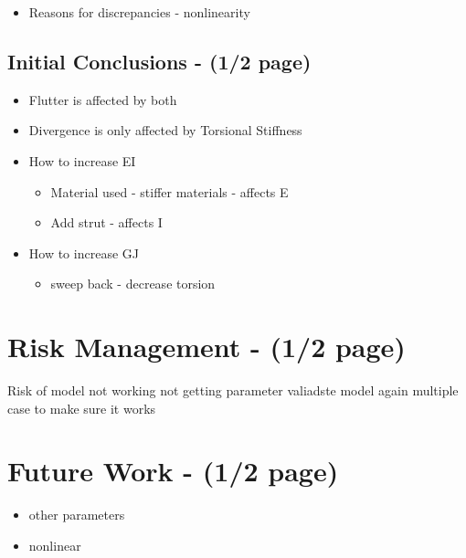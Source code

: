 \documentclass[11pt]{article}
\begin{document}
\begin{itemize}
    \item Reasons for discrepancies - nonlinearity
\end{itemize}

\subsection{Initial Conclusions - (1/2 page)}
\begin{itemize}
    \item Flutter is affected by both
    \item Divergence is only affected by Torsional Stiffness
    \item How to increase EI
    \begin{itemize}
        \item Material used - stiffer materials - affects E
        \item Add strut - affects I
    \end{itemize}
    \item How to increase GJ
    \begin{itemize}
        \item sweep back - decrease torsion
    \end{itemize}
\end{itemize}

\section{Risk Management - (1/2 page)}
Risk of model not working
not getting parameter
valiadste model again multiple case to make sure it works

\section{Future Work - (1/2 page)}
\begin{itemize}
    \item other parameters
    \item nonlinear
\end{itemize}

\end{document}
